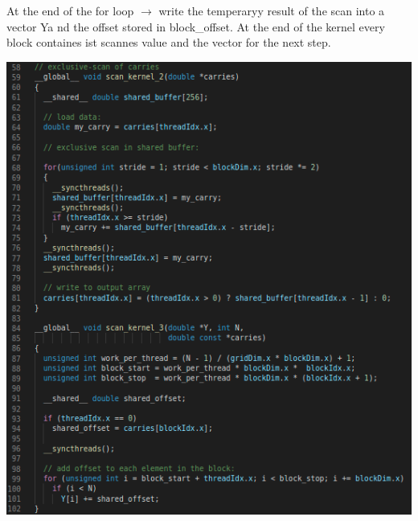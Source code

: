 \documentclass[11pt,a4paper]{article}
\begin{document}
At the end of the for loop $\rightarrow$ write the temperaryy result of the scan into a vector Ya nd the offset stored in block\_offset. At the end of the kernel every block containes ist scannes value and the vector for the next step.
\begin{center}
	
	\begin{minipage}[t]{0.40\textwidth}
		\includegraphics[width=\textwidth]{Bilder/Ex5_1_2}
	\end{minipage}
	
\end{center}
\newpage 
	
\end{document}
